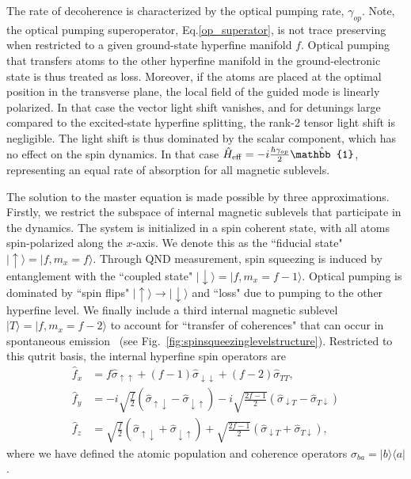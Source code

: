 \documentclass[preprint,aps,pra,onecolumn,superscriptaddress]{revtex4-1} %
\def\bra#1{\langle{#1}\rvert}%
\def\ket#1{\lvert{#1}\rangle}%
\begin{document}
The rate of decoherence is characterized by the optical pumping rate, $\gamma_{op}$.  Note, the optical pumping superoperator, Eq.\eqref{op_superator},  is not trace preserving when restricted to a given ground-state hyperfine manifold $f$.  Optical pumping that transfers atoms to the other hyperfine manifold in the ground-electronic state is thus treated as loss. Moreover, if the atoms are placed at the optimal position in the transverse plane, the local field of the guided mode is linearly polarized.  In that case the vector light shift vanishes, and for detunings large compared to the excited-state hyperfine splitting, the rank-2 tensor light shift is negligible. The light shift is thus dominated by the scalar component, which has no effect on the spin dynamics. In that case $\hat{H}_{\rm eff} = -i \frac{\hbar\gamma_{op}}{2} \hat{\mathbb{1}}$, representing an equal rate of absorption for all magnetic sublevels.

The solution to the master equation is made possible by three approximations. Firstly, we restrict the subspace of internal magnetic sublevels that participate in the dynamics.  The system is initialized in a spin coherent state, with all atoms spin-polarized along the $x$-axis.  We denote this as the ``fiducial state" $\ket{\uparrow} = \ket{f, m_x =f}$.   Through QND measurement, spin squeezing is induced by entanglement with the  ``coupled state"  $\ket{\downarrow} = \ket{f, m_x=f-1}$.  Optical pumping is dominated by ``spin flips" $\ket{\uparrow}\rightarrow \ket{\downarrow}$ and ``loss" due to pumping to the other hyperfine level.  We finally include a third internal magnetic sublevel $\ket{T} = \ket{f, m_x=f-2}$ to account for  ``transfer of coherences" that can occur in spontaneous emission~\cite{Norris2012Enhanced,Norris2014} (see Fig.~\ref{fig:spinsqueezinglevelstructure}).  Restricted to this qutrit basis, the internal hyperfine spin operators are
\begin{subequations}\label{eq:f_in_xbasis}
\begin{align}
\hat{f}_x &= f \hat{\sigma}_{\uparrow \uparrow} +(f-1) \hat{\sigma}_{\downarrow \downarrow} + (f-2)  \hat{\sigma}_{T T}, \\
\hat{f}_y &=-i \sqrt{\frac{f}{2}} \left(\hat{\sigma}_{\uparrow \downarrow} - \hat{\sigma}_{\downarrow \uparrow}\right) -i \sqrt{\frac{2f-1}{2}}  \left(\hat{\sigma}_{\downarrow T} - \hat{\sigma}_{T \downarrow }\right) \\
\hat{f}_z &= \sqrt{\frac{f}{2}} \left(\hat{\sigma}_{\uparrow \downarrow} + \hat{\sigma}_{\downarrow \uparrow}\right) + \sqrt{\frac{2f-1}{2}}  \left(\hat{\sigma}_{\downarrow T} + \hat{\sigma}_{T \downarrow }\right),
\end{align}
\end{subequations}
where we have defined the atomic population and coherence operators $\hat{\sigma}_{ba}=\ket{b}\bra{a}$.
\end{document}
